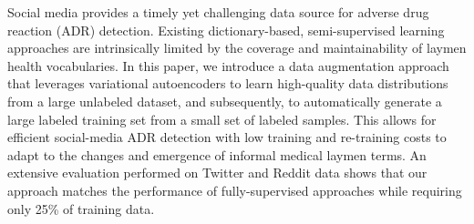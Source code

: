Social media provides a timely yet challenging data source for adverse drug reaction (ADR) detection. Existing dictionary-based, semi-supervised learning approaches are intrinsically limited by the coverage and maintainability of laymen health vocabularies. In this paper, we introduce a data augmentation approach that leverages variational autoencoders to learn high-quality data distributions from a large unlabeled dataset, and subsequently, to automatically generate a large labeled training set from a small set of labeled samples. This allows for efficient social-media ADR detection with low training and re-training costs to adapt to the changes and emergence of informal medical laymen terms. An extensive evaluation performed on Twitter and Reddit data shows that our approach matches the performance of fully-supervised approaches while requiring only 25\% of training data.